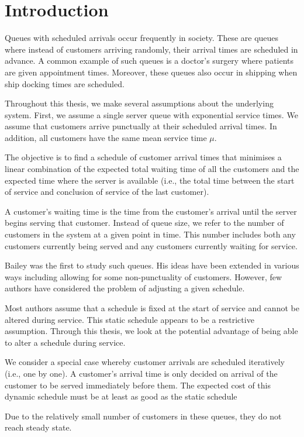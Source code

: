 \chapter{Introduction}

Queues with scheduled arrivals occur frequently in society. These are queues where instead of customers arriving randomly, their arrival times are scheduled in advance. A common example of such queues is a doctor's surgery where patients are given appointment times. Moreover, these queues also occur in shipping when ship docking times are scheduled.

Throughout this thesis, we make several assumptions about the underlying system. First, we assume a single server queue with exponential service times. We assume that customers arrive punctually at their scheduled arrival times. In addition, all customers have the same mean service time $\mu$.

The objective is to find a schedule of customer arrival times that minimises a linear combination of the expected total waiting time of all the customers and the expected time where the server is available (i.e., the total time between the start of service and conclusion of service of the last customer).

A customer's waiting time is the time from the customer's arrival until the server begins serving that customer. Instead of queue size, we refer to the number of customers in the system at a given point in time. This number includes both any customers currently being served and any customers currently waiting for service.

Bailey was the first to study such queues. His ideas have been extended in various ways including allowing for some non-punctuality of customers. However, few authors have considered the problem of adjusting a given schedule.

Most authors assume that a schedule is fixed at the start of service and cannot be altered during service. This static schedule appears to be a restrictive assumption. Through this thesis, we look at the potential advantage of being able to alter a schedule during service.

We consider a special case whereby customer arrivals are scheduled iteratively (i.e., one by one). A customer's arrival time is only decided on arrival of the customer to be served immediately before them. The expected cost of this dynamic schedule must be at least as good as the static schedule

Due to the relatively small number of customers in these queues, they do not reach steady state.